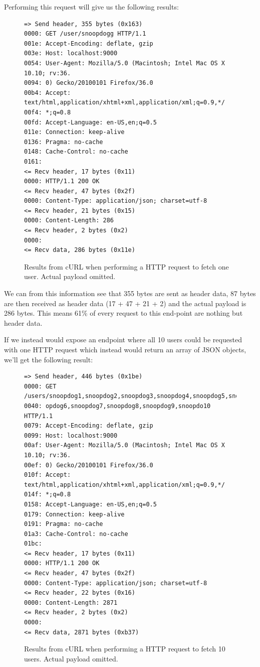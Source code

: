 \documentclass{cslthse-msc}
\begin{document}
Performing this request will give us the following results:

\begin{figure}[H]
  \centering
\begin{lstlisting}[breaklines=true]
=> Send header, 355 bytes (0x163)
0000: GET /user/snoopdogg HTTP/1.1
001e: Accept-Encoding: deflate, gzip
003e: Host: localhost:9000
0054: User-Agent: Mozilla/5.0 (Macintosh; Intel Mac OS X 10.10; rv:36.
0094: 0) Gecko/20100101 Firefox/36.0
00b4: Accept: text/html,application/xhtml+xml,application/xml;q=0.9,*/
00f4: *;q=0.8
00fd: Accept-Language: en-US,en;q=0.5
011e: Connection: keep-alive
0136: Pragma: no-cache
0148: Cache-Control: no-cache
0161:
<= Recv header, 17 bytes (0x11)
0000: HTTP/1.1 200 OK
<= Recv header, 47 bytes (0x2f)
0000: Content-Type: application/json; charset=utf-8
<= Recv header, 21 bytes (0x15)
0000: Content-Length: 286
<= Recv header, 2 bytes (0x2)
0000:
<= Recv data, 286 bytes (0x11e)
\end{lstlisting}
  \caption{Results from cURL when performing a HTTP request to fetch one user. Actual payload omitted.}
\end{figure}

We can from this information see that 355 bytes are sent as header data, 87 bytes are then received as header data (17 + 47 + 21 + 2) and the actual payload is 286 bytes. This means 61\% of every request to this end-point are nothing but header data.

If we instead would expose an endpoint where all 10 users could be requested with one HTTP request which instead would return an array of JSON objects, we'll get the following result:

\begin{figure}[H]
  \centering
\begin{lstlisting}[breaklines=true]
=> Send header, 446 bytes (0x1be)
0000: GET /users/snoopdog1,snoopdog2,snoopdog3,snoopdog4,snoopdog5,sno
0040: opdog6,snoopdog7,snoopdog8,snoopdog9,snoopdo10 HTTP/1.1
0079: Accept-Encoding: deflate, gzip
0099: Host: localhost:9000
00af: User-Agent: Mozilla/5.0 (Macintosh; Intel Mac OS X 10.10; rv:36.
00ef: 0) Gecko/20100101 Firefox/36.0
010f: Accept: text/html,application/xhtml+xml,application/xml;q=0.9,*/
014f: *;q=0.8
0158: Accept-Language: en-US,en;q=0.5
0179: Connection: keep-alive
0191: Pragma: no-cache
01a3: Cache-Control: no-cache
01bc:
<= Recv header, 17 bytes (0x11)
0000: HTTP/1.1 200 OK
<= Recv header, 47 bytes (0x2f)
0000: Content-Type: application/json; charset=utf-8
<= Recv header, 22 bytes (0x16)
0000: Content-Length: 2871
<= Recv header, 2 bytes (0x2)
0000:
<= Recv data, 2871 bytes (0xb37)
\end{lstlisting}
  \caption{Results from cURL when performing a HTTP request to fetch 10 users. Actual payload omitted.}
\end{figure}
\end{document}
